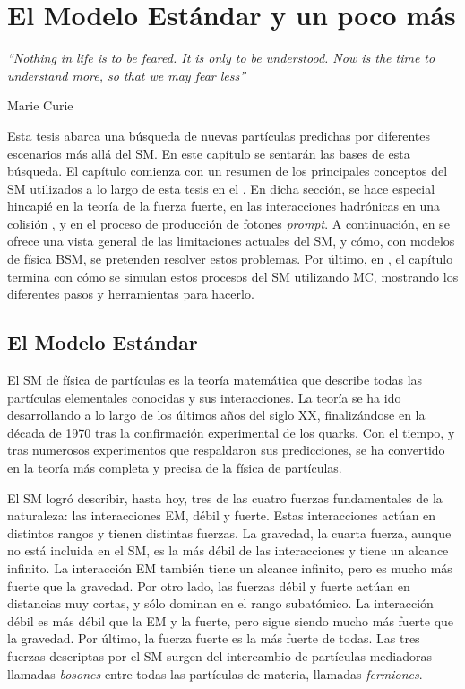 \chapter{El Modelo Est\'andar y un poco m\'as}
\label{ch:theory}
\epigraph{\emph{\enquote{Nothing in life is to be feared. It is only to be understood. Now is the time to understand more, so that we may fear less}}}{Marie Curie}


Esta tesis abarca una búsqueda de nuevas partículas predichas por diferentes escenarios más allá del \ac{SM}. En este capítulo se sentarán las bases de esta búsqueda.
El capítulo comienza con un resumen de los principales conceptos del \ac{SM} utilizados a lo largo de esta tesis en el \Sect{\ref{sec:theory:sm}}. En dicha sección, se hace especial hincapié en la teoría de la fuerza fuerte, en las interacciones hadrónicas en una colisión \pp, y en el proceso de producción de fotones \textit{prompt}.
A continuación, en \Sect{\ref{sec:theory:bsm}} se ofrece una vista general de las limitaciones actuales del \ac{SM}, y c\'omo, con modelos de f\'isica \ac{BSM}, se pretenden resolver estos problemas.
Por último, en \Sect{\ref{sec:theory:mc_simulation}}, el capítulo termina con cómo se simulan estos procesos del \ac{SM} utilizando \ac{MC}, mostrando los diferentes pasos y herramientas para hacerlo.




\section{El Modelo Est\'andar}
\label{sec:theory:sm}

El \acf{SM} de física de partículas es la teoría matemática que describe todas las partículas elementales conocidas y sus interacciones.
La teoría se ha ido desarrollando a lo largo de los últimos años del siglo XX, finalizándose en la década de 1970 tras la confirmación experimental de los quarks.
Con el tiempo, y tras numerosos experimentos que respaldaron sus predicciones, se ha convertido en la teoría más completa y precisa de la física de partículas.

El \ac{SM} logró describir, hasta hoy, tres de las cuatro fuerzas fundamentales de la naturaleza: las interacciones \ac{EM}, débil y fuerte.
Estas interacciones actúan en distintos rangos y tienen distintas fuerzas. La gravedad, la cuarta fuerza, aunque no está incluida en el \ac{SM}, es la más débil de las interacciones y tiene un alcance infinito. La interacción \ac{EM} también tiene un alcance infinito, pero es mucho más fuerte que la gravedad. Por otro lado, las fuerzas débil y fuerte actúan en distancias muy cortas, y sólo dominan en el rango subatómico. La interacción débil es más débil que la \ac{EM} y la fuerte, pero sigue siendo mucho más fuerte que la gravedad. Por último, la fuerza fuerte es la más fuerte de todas.
Las tres fuerzas descriptas por el \ac{SM} surgen del intercambio de partículas mediadoras llamadas \textit{bosones} entre todas las partículas de materia, llamadas \textit{fermiones}.




